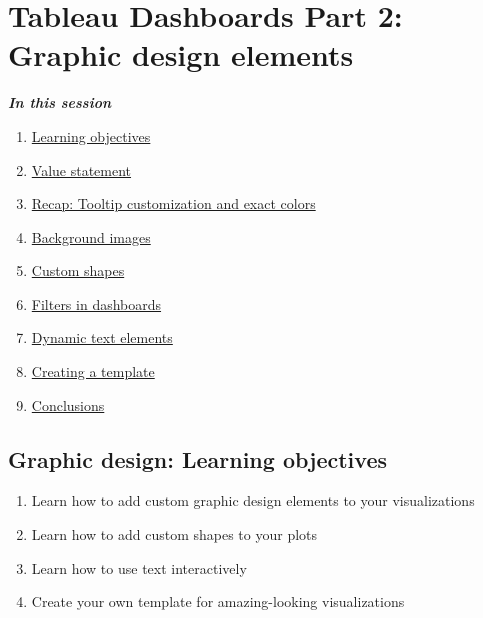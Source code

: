 \documentclass[
]{book}
\providecommand{\tightlist}{%
  \setlength{\itemsep}{0pt}\setlength{\parskip}{0pt}}
\begin{document}
\hypertarget{tableau-dashboards-part-2-graphic-design-elements}{%
\section{Tableau Dashboards Part 2: Graphic design elements}\label{tableau-dashboards-part-2-graphic-design-elements}}

\textbf{\emph{In this session }}

\begin{enumerate}
\def\labelenumi{\arabic{enumi}.}
\tightlist
\item
  \protect\hyperlink{graphic-design-learning-objectives}{Learning objectives}
\item
  \protect\hyperlink{graphic-design-value-statement}{Value statement}
\item
  \protect\hyperlink{recap-tooltip-customization-and-exact-colors}{Recap: Tooltip customization and exact colors}
\item
  \protect\hyperlink{background-images}{Background images}
\item
  \protect\hyperlink{custom-shapes}{Custom shapes}
\item
  \protect\hyperlink{filters-in-dashboards}{Filters in dashboards}
\item
  \protect\hyperlink{dynamic-text-elements}{Dynamic text elements}
\item
  \href{creating-a-template}{Creating a template}
\item
  \protect\hyperlink{conclusions}{Conclusions}
\end{enumerate}

\hypertarget{graphic-design-learning-objectives}{%
\subsection{Graphic design: Learning objectives}\label{graphic-design-learning-objectives}}

\begin{enumerate}
\def\labelenumi{\arabic{enumi}.}
\tightlist
\item
  Learn how to add custom graphic design elements to your visualizations
\item
  Learn how to add custom shapes to your plots
\item
  Learn how to use text interactively
\item
  Create your own template for amazing-looking visualizations
\end{enumerate}
\end{document}
